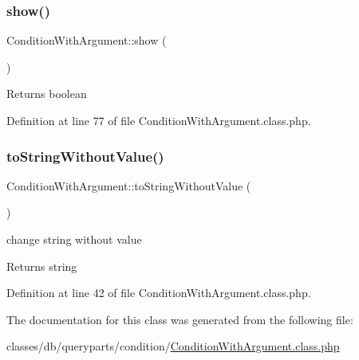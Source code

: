 \subsubsection{\texorpdfstring{show()}{show()}}
{\footnotesize\ttfamily Condition\+With\+Argument\+::show (\begin{DoxyParamCaption}{ }\end{DoxyParamCaption})}

\begin{DoxyReturn}{Returns}
boolean 
\end{DoxyReturn}


Definition at line 77 of file Condition\+With\+Argument.\+class.\+php.

\hypertarget{classConditionWithArgument_adf2841f219b6bf3b96414c2c6100ce6c}{}\label{classConditionWithArgument_adf2841f219b6bf3b96414c2c6100ce6c} 
\subsubsection{\texorpdfstring{to\+String\+Without\+Value()}{toStringWithoutValue()}}
{\footnotesize\ttfamily Condition\+With\+Argument\+::to\+String\+Without\+Value (\begin{DoxyParamCaption}{ }\end{DoxyParamCaption})}

change string without value \begin{DoxyReturn}{Returns}
string 
\end{DoxyReturn}


Definition at line 42 of file Condition\+With\+Argument.\+class.\+php.



The documentation for this class was generated from the following file\+:\begin{DoxyCompactItemize}
\item 
classes/db/queryparts/condition/\hyperlink{ConditionWithArgument_8class_8php}{Condition\+With\+Argument.\+class.\+php}\end{DoxyCompactItemize}
